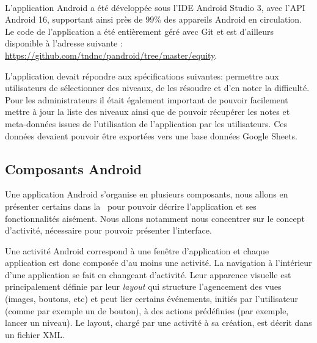 \documentclass[../main.tex]{subfiles}
\begin{document}
	\paragraph{}L'application Android a été développée sous l'IDE Android Studio 3, avec l'API Android 16, supportant ainsi près de 99\% des appareils Android en circulation. Le code de l'application a été entièrement géré avec Git et est d'ailleurs disponible à l'adresse suivante : \url{https://github.com/tndnc/pandroid/tree/master/equity}. 
	
	L'application devait répondre aux spécifications suivantes: permettre aux utilisateurs de sélectionner des niveaux, de les résoudre et d'en noter la difficulté. Pour les administrateurs il était également important de pouvoir facilement mettre à jour la liste des niveaux ainsi que de pouvoir récupérer les notes et meta-données issues de l'utilisation de l'application par les utilisateurs. Ces données devaient pouvoir être exportées vers une base données Google Sheets.
	
	\subsection{Composants Android}
	Une application Android s'organise en plusieurs composants, nous allons en présenter certains dans la~ pour pouvoir décrire l'application et ses fonctionnalités aisément. Nous allons notamment nous concentrer sur le concept d'activité, nécessaire pour pouvoir présenter l'interface.
	
	Une activité Android correspond à une fenêtre d'application et chaque application est donc composée d'au moins une activité. La navigation à l'intérieur d'une application se fait en changeant d'activité. Leur apparence visuelle est principalement définie par leur \textit{layout} qui structure l'agencement des vues (images, boutons, etc) et peut lier certains événements, initiés par l'utilisateur (comme par exemple un  de bouton), à des actions prédéfinies (par exemple, lancer un niveau). Le layout, chargé par une activité à sa création, est décrit dans un fichier XML.
	
\end{document}
